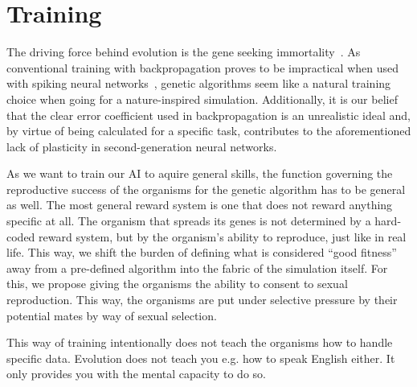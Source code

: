 \section{Training}
The driving force behind evolution is the gene seeking immortality~\cite{Dawkins1976}.
As conventional training with backpropagation proves to be impractical when used with
spiking neural networks~\cite{Paugam-Moisy2012}, genetic algorithms seem like a natural training choice
when going for a nature-inspired simulation. Additionally, it is our belief that the clear error
coefficient used in backpropagation is an unrealistic ideal and, by virtue of being calculated for
a specific task, contributes to the aforementioned lack of plasticity in second-generation neural networks.

As we want to train our AI to aquire general skills, the function governing the reproductive success of
the organisms for the genetic algorithm has to be general as well. The most general reward system
is one that does not reward anything specific at all. The organism that spreads its 
genes is not determined by a hard-coded reward system, but by the organism's ability to reproduce, 
just like in real life. This way, we shift the burden of defining what is considered ``good fitness''
away from a pre-defined algorithm into the fabric of the simulation itself.
For this, we propose giving the organisms the ability to consent to sexual reproduction.
This way, the organisms are put under selective pressure by their potential mates 
by way of sexual selection.~\cite{Dawkins1982}

This way of training intentionally does not teach the organisms how to handle specific data.
Evolution does not teach you e.g. how to speak English either. It only provides you with the mental
capacity to do so.
